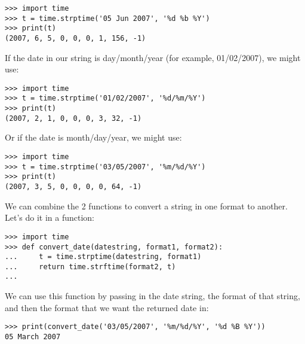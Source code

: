 \begin{listingignore}
\begin{verbatim}
>>> import time
>>> t = time.strptime('05 Jun 2007', '%d %b %Y')
>>> print(t)
(2007, 6, 5, 0, 0, 0, 1, 156, -1)
\end{verbatim}
\end{listingignore}

\noindent
If the date in our string is day/month/year (for example, 01/02/2007), we might use:

\begin{listingignore}
\begin{verbatim}
>>> import time
>>> t = time.strptime('01/02/2007', '%d/%m/%Y')
>>> print(t)
(2007, 2, 1, 0, 0, 0, 3, 32, -1)
\end{verbatim}
\end{listingignore}

\noindent
Or if the date is month/day/year, we might use:

\begin{listingignore}
\begin{verbatim}
>>> import time
>>> t = time.strptime('03/05/2007', '%m/%d/%Y')
>>> print(t)
(2007, 3, 5, 0, 0, 0, 0, 64, -1)
\end{verbatim}
\end{listingignore}

\noindent
We can combine the 2 functions to convert a string in one format to another. Let's do it in a function:

\begin{listing}
\begin{verbatim}
>>> import time
>>> def convert_date(datestring, format1, format2):
...     t = time.strptime(datestring, format1)
...     return time.strftime(format2, t)
...
\end{verbatim}
\end{listing}

\noindent
We can use this function by passing in the date string, the format of that string, and then the format that we want the returned date in:

\begin{listing}
\begin{verbatim}
>>> print(convert_date('03/05/2007', '%m/%d/%Y', '%d %B %Y'))
05 March 2007
\end{verbatim}
\end{listing}

\newpage
